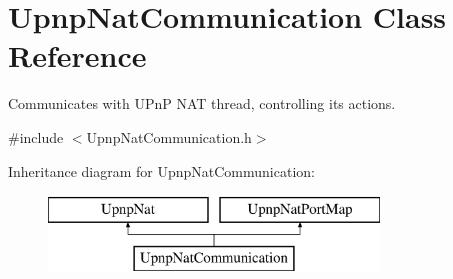 \hypertarget{class_upnp_nat_communication}{
\section{UpnpNatCommunication Class Reference}
\label{class_upnp_nat_communication}
}


Communicates with UPnP NAT thread, controlling its actions.  




{\ttfamily \#include $<$UpnpNatCommunication.h$>$}

Inheritance diagram for UpnpNatCommunication:\begin{figure}[H]
\begin{center}
\leavevmode
\includegraphics[height=2.000000cm]{class_upnp_nat_communication}
\end{center}
\end{figure}
